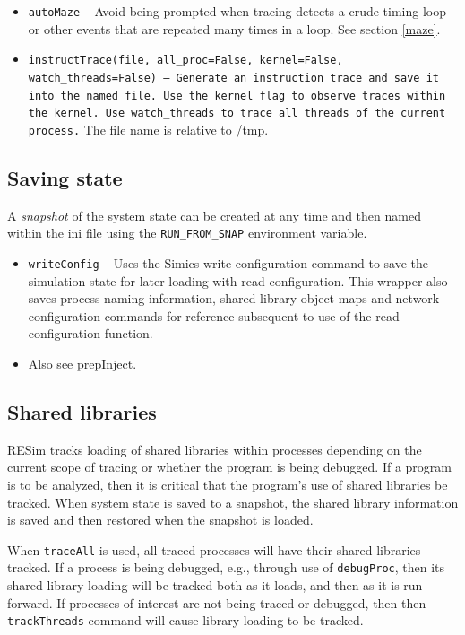 \documentclass[titlepage]{article}
\begin{document}
\begin{itemize}
\item {\tt autoMaze} -- Avoid being prompted when tracing detects a crude timing loop or other events that are repeated many times in a loop.
See section \ref{maze}.

\item {\tt instructTrace(file, all\_proc=False, kernel=False, watch\_threads=False) -- Generate an instruction trace and save it into the named file. Use the kernel
flag to observe traces within the kernel. Use {\tt watch\_threads} to trace all threads of the current process.}  The file name is relative to /tmp.
\end{itemize}

\subsection{Saving state}
A \textit{snapshot} of the system state can be created at any time and then named within the ini file using the {\tt RUN\_FROM\_SNAP} environment variable.

\begin{itemize}
\item {\tt writeConfig} – Uses the Simics write-configuration command to save the simulation state for later loading with read-configuration.  This wrapper also saves process naming information, shared library object maps and network configuration commands for reference subsequent to use of the read-configuration function.
\item Also see prepInject.
\end{itemize}

\subsection{Shared libraries}
RESim tracks loading of shared libraries within processes depending on the current scope of tracing or whether the program
is being debugged.
If a program is to be analyzed, then it is critical that the program's use of shared libraries be tracked.  When system state is 
saved to a snapshot, the shared library information is saved and then restored when the snapshot is loaded.

When {\tt traceAll} is used, all traced processes will have their shared libraries tracked.  If a process is being debugged, e.g.,
through use of {\tt debugProc}, then its shared library loading will be tracked both as it loads, and then as it is run forward.
If processes of interest are not being traced or debugged, then then {\tt trackThreads} command will cause library loading to be tracked.
\end{document}
